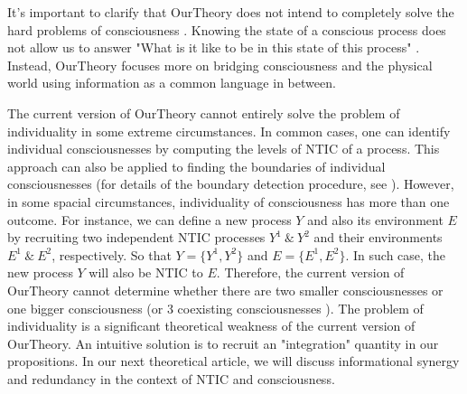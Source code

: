 \documentclass[utf8]{article}
\begin{document}
        
        It's important to clarify that \ac{OurTheory} does not intend to completely solve the hard problems of consciousness \citep{chalmers1995facing}. Knowing the state of a conscious process does not allow us to answer "What is it like to be in this state of this process" \citep{nagel1974like}. Instead, \ac{OurTheory} focuses more on bridging consciousness and the physical world using information as a common language in between. %
        
        
        The current version of \ac{OurTheory} cannot entirely solve the problem of individuality in some extreme circumstances. In common cases, one can identify individual consciousnesses by computing the levels of NTIC of a process. This approach can also be applied to finding the boundaries of individual consciousnesses (for details of the boundary detection procedure, see \cite{krakauer2014information}). However, in some spacial circumstances, individuality of consciousness has more than one outcome. For instance,
        we can define a new process $Y$ and also its environment $E$ by recruiting two independent NTIC processes $Y^1~\&~Y^2$ and their environments $E^1~\&~E^2$, respectively. So that $Y = \{Y^1,Y^2\}$ and $E=\{E^1,E^2\}$. In such case, the new process $Y$ will also be NTIC to $E$. Therefore, the current version of \ac{OurTheory} cannot determine whether there are two smaller consciousnesses or one bigger consciousness (or 3 coexisting consciousnesses ). The problem of individuality is a significant theoretical weakness of the current version of \ac{OurTheory}. An intuitive solution is to recruit an "integration" quantity in our propositions. In our next theoretical article, we will discuss informational synergy and redundancy in the context of NTIC and consciousness. 
        
\end{document}
